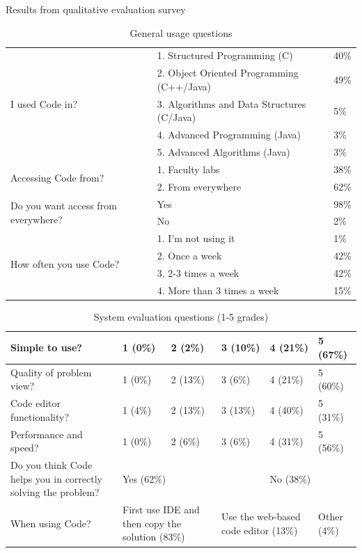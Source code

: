 \documentclass{llncs}
\begin{document}
Results from qualitative evaluation survey

\begin{table}
\caption{General usage questions}
\begin{center}
\begin{tabular}{ |p{5cm}|p{5cm}|l| }
\hline
\multirow{5}{*}{I used Code in?} & 1. Structured Programming (C) & 40\% \\
\cline{2-3}
 & 2. Object Oriented Programming (C++/Java) & 49\% \\
 \cline{2-3}
 & 3. Algorithms and Data Structures (C/Java) & 5\% \\
 \cline{2-3}
 & 4. Advanced Programming (Java) & 3\% \\
 \cline{2-3}
 & 5. Advanced Algorithms (Java) & 3\% \\
 \cline{2-3}
\hline
\multirow{2}{*}{Accessing Code from?} & 1. Faculty labs & 38\% \\
 & 2. From everywhere & 62\% \\
 \hline
\multirow{2}{5cm}{Do you want access from everywhere?} & Yes & 98\% \\
\cline{2-3}
 & No & 2\% \\
\hline
\multirow{4}{*}{How often you use Code?} & 1. I'm not using it & 1\% \\
\cline{2-3}
 & 2. Once a week & 42\% \\
 \cline{2-3}
 & 3. 2-3 times a week & 42\% \\
 \cline{2-3}
 & 4. More than 3 times a week & 15\% \\
 \cline{2-3}
\hline
\end{tabular}
\label{table:plagiarism_results}
\end{center}
\end{table}

\begin{table}
\caption{System evaluation questions (1-5 grades)}
\begin{center}
\begin{tabular}{ |p{5cm}|l|l|l|l|l| }
\hline
 Simple to use? & 1 (0\%) & 2 (2\%) & 3 (10\%) & 4 (21\%) & 5 (67\%) \\
\hline
Quality of problem view? & 1 (0\%) & 2 (13\%) & 3 (6\%) & 4 (21\%) & 5 (60\%) \\
\hline
Code editor functionality? & 1 (4\%) & 2 (13\%) & 3 (13\%) & 4 (40\%) & 5 (31\%)
\\
\hline
Performance and speed? & 1 (0\%) & 2 (6\%) & 3 (6\%) & 4 (31\%) & 5 (56\%) \\
\hline
Do you think Code helps you in correctly solving the problem? &
\multicolumn{3}{|l|}{Yes (62\%)} & \multicolumn{2}{|l|}{No (38\%)}
 \\
\hline
When using Code? & \multicolumn{2}{|p{2.5cm}|}{First use IDE and then copy the
solution (83\%)} & \multicolumn{2}{|p{2.5cm}|}{Use the web-based code editor
(13\%)} & Other (4\%) \\
\hline
\end{tabular}
\label{table:system_evaluation}
\end{center}
\end{table}
\end{document}
